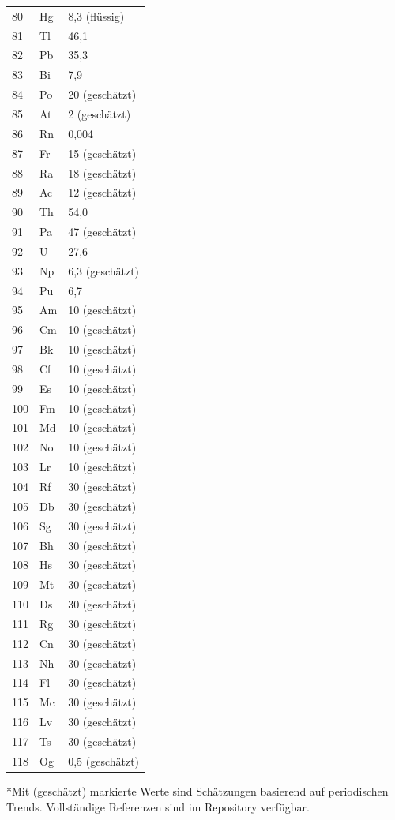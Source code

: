\documentclass[12pt,a4paper]{article}
\begin{document}
\begin{longtable}{p{0.6cm}p{1.2cm}p{1.5cm}}
		80 & Hg & 8,3 (flüssig) \\
		81 & Tl & 46,1 \\
		82 & Pb & 35,3 \\
		83 & Bi & 7,9 \\
		84 & Po & 20 (geschätzt) \\
		85 & At & 2 (geschätzt) \\
		86 & Rn & 0,004 \\
		87 & Fr & 15 (geschätzt) \\
		88 & Ra & 18 (geschätzt) \\
		89 & Ac & 12 (geschätzt) \\
		90 & Th & 54,0 \\
		91 & Pa & 47 (geschätzt) \\
		92 & U  & 27,6 \\
		93 & Np & 6,3 (geschätzt) \\
		94 & Pu & 6,7 \\
		95 & Am & 10 (geschätzt) \\
		96 & Cm & 10 (geschätzt) \\
		97 & Bk & 10 (geschätzt) \\
		98 & Cf & 10 (geschätzt) \\
		99 & Es & 10 (geschätzt) \\
		100& Fm & 10 (geschätzt) \\
		101& Md & 10 (geschätzt) \\
		102& No & 10 (geschätzt) \\
		103& Lr & 10 (geschätzt) \\
		104& Rf & 30 (geschätzt) \\
		105& Db & 30 (geschätzt) \\
		106& Sg & 30 (geschätzt) \\
		107& Bh & 30 (geschätzt) \\
		108& Hs & 30 (geschätzt) \\
		109& Mt & 30 (geschätzt) \\
		110& Ds & 30 (geschätzt) \\
		111& Rg & 30 (geschätzt) \\
		112& Cn & 30 (geschätzt) \\
		113& Nh & 30 (geschätzt) \\
		114& Fl & 30 (geschätzt) \\
		115& Mc & 30 (geschätzt) \\
		116& Lv & 30 (geschätzt) \\
		117& Ts & 30 (geschätzt) \\
		118& Og & 0,5 (geschätzt) \\
		\bottomrule
	\end{longtable}
	*Mit (geschätzt) markierte Werte sind Schätzungen basierend auf periodischen Trends. Vollständige Referenzen sind im Repository verfügbar.
	
\end{document}
